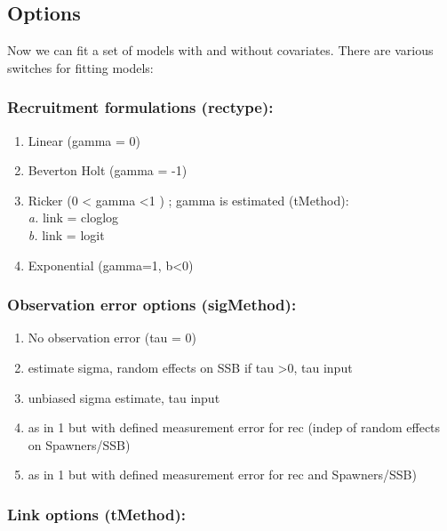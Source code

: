 \documentclass[
]{article}
\providecommand{\tightlist}{%
  \setlength{\itemsep}{0pt}\setlength{\parskip}{0pt}}
\begin{document}
\hypertarget{options}{%
\subsection{Options}\label{options}}

Now we can fit a set of models with and without covariates. There are
various switches for fitting models:

\hypertarget{recruitment-formulations-rectype}{%
\subsubsection{Recruitment formulations
(rectype):}\label{recruitment-formulations-rectype}}

\begin{enumerate}
\def\labelenumi{\arabic{enumi}.}
\tightlist
\item
  Linear (gamma = 0)
\item
  Beverton Holt (gamma = -1)
\item
  Ricker (0 \textless{} gamma \textless1 ) ; gamma is estimated
  (tMethod):\\
  \emph{a. }link = cloglog\\
  \emph{b. }link = logit
\item
  Exponential (gamma=1, b\textless0)
\end{enumerate}

\hypertarget{observation-error-options-sigmethod}{%
\subsubsection{Observation error options
(sigMethod):}\label{observation-error-options-sigmethod}}

\begin{enumerate}
\def\labelenumi{\arabic{enumi}.}
\setcounter{enumi}{-1}
\tightlist
\item
  No observation error (tau = 0)
\item
  estimate sigma, random effects on SSB if tau \textgreater0, tau input
\item
  unbiased sigma estimate, tau input
\item
  as in 1 but with defined measurement error for rec (indep of random
  effects on Spawners/SSB)
\item
  as in 1 but with defined measurement error for rec and Spawners/SSB)
\end{enumerate}

\hypertarget{link-options-tmethod}{%
\subsubsection{Link options (tMethod):}\label{link-options-tmethod}}
\end{document}
